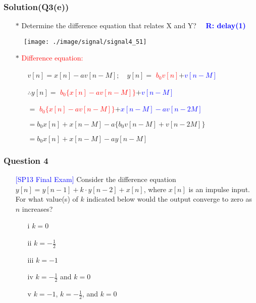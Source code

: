 \documentclass{beamer}
\newcommand{\blue}[1]{\textcolor{blue}{#1}}
\newcommand{\red}[1]{\textcolor{red}{#1}}
\begin{document}
\begin{frame}
\frametitle{Solution(Q3(e))}

\begin{itemize} \itemsep1pt \parskip0pt 
  \item[$\ast$] Determine the difference equation that relates X and Y?  ~~\blue{\bf R: delay(1)}
\end{itemize}

\begin{figure}[H]
  \label{signal4_5}
  \centering
  \texttt{[image: ./image/signal/signal4\_51]}
\end{figure}

\begin{itemize} \itemsep1pt \parskip0pt 
  \item[$\ast$] \red{Difference equation:}
  \begin{itemize} \itemsep1pt \parskip0pt 
    \item[] $v[n] = x[n] - av[n-M]; $~~$y[n] = $ \red{$b_0v[n]$}$ + $\blue{$v[n-M]$}
    \item[] $\therefore y[n] = $ \red{$b_0 \{ x[n]-av[n-M]\}$}$ + $\blue{$v[n-M]$}
    \item[] \hspace{10 mm}$= $ \red{$b_0 \{ x[n]-av[n-M]\}$}$ + $\blue{$x[n-M]-av[n-2M]$}
    \item[] \hspace{10 mm}$= b_0x[n] + x[n-M]-a \{ b_0v[n-M] + v[n-2M]\}$
    \item[] \hspace{10 mm}$= b_0x[n] + x[n-M] - ay[n-M]$
  \end{itemize}
\end{itemize}

\end{frame}


\begin{frame}
\frametitle{Question 4}

\begin{itemize} \itemsep1pt \parskip0pt 
  \item[] \blue{[SP13 Final Exam]} Consider the difference equation $y[n] = y[n-1] + k \cdot y[n-2] + x[n]$, where $x[n]$ is an impulse input. For what value(s) of $k$ indicated below would the output converge to zero as $n$ increases?
  \begin{itemize} \itemsep1pt \parskip0pt 
    \item[i] $k = 0$
    \item[ii] $k = -\frac{1}{2}$
    \item[iii] $k = -1$
    \item[iv] $k = -\frac{1}{2}$ and $k = 0$
    \item[v] $k = -1$, $k = -\frac{1}{2}$, and $k = 0$
  \end{itemize}
\end{itemize}

\vspace{6 cm}


\end{frame}
\end{document}
